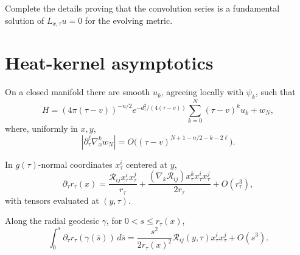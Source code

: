\begin{claim}
\label{clm:chow-iii-fundamental-solution-exercise}
Complete the details proving that the convolution series is a fundamental
solution of \(L_{x,\tau}u=0\) for the evolving metric.
\end{claim}

\section{Heat-kernel asymptotics}

\begin{theorem}
\label{thm:chow-iii-evolving-heat-kernel-expansion}
On a closed manifold there are smooth \(u_k\), agreeing locally with
\(\psi_k\), such that
\[
 H=(4\pi(\tau-v))^{-n/2}e^{-d_\tau^2/(4(\tau-v))}
 \sum_{k=0}^N(\tau-v)^ku_k+w_N,
\]
where, uniformly in \(x,y\),
\[
 |\partial_\tau^\ell\nabla_x^kw_N|
 =O\bigl((\tau-v)^{N+1-n/2-k-2\ell}\bigr).
\]
\end{theorem}

\begin{lemma}
\label{lem:chow-iii-changing-distance-expansion}
In \(g(\tau)\)-normal coordinates \(x_\tau^i\) centered at \(y\),
\[
 \partial_\tau r_\tau(x)=\frac{\mathcal R_{ij}x_\tau^ix_\tau^j}{r_\tau}
 +\frac{(\nabla_k\mathcal R_{ij})x_\tau^kx_\tau^ix_\tau^j}{2r_\tau}
 +O(r_\tau^3),
\]
with tensors evaluated at \((y,\tau)\).
\end{lemma}

\begin{remark}
\label{rem:chow-iii-integrated-distance-expansion}
Along the radial geodesic \(\gamma\), for \(0<s\le r_\tau(x)\),
\[
 \int_0^s\partial_\tau r_\tau(\gamma(\bar s))\,d\bar s
 =\frac{s^2}{2r_\tau(x)^2}\mathcal R_{ij}(y,\tau)x_\tau^ix_\tau^j
 +O(s^3).
\]
\end{remark}

